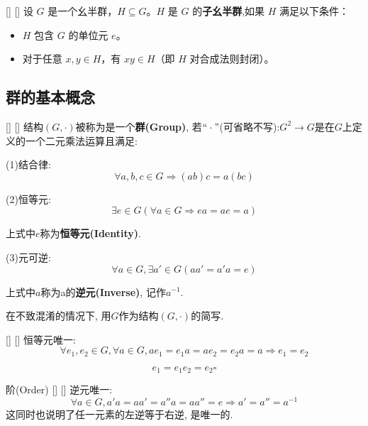 \documentclass[UTF8]{ctexart}
\begin{document}
		\begin{dfn}
            []
            {}
            []
            []
			设 \( G \) 是一个幺半群，\( H \subseteq G \)。\( H \) 是 \( G \) 的\textbf{子幺半群},如果 \( H \) 满足以下条件：
			\begin{itemize}
			\item \( H \) 包含 \( G \) 的单位元 \( e \)。
			\item 对于任意 \( x, y \in H \)，有 \( xy \in H \)（即 \( H \) 对合成法则封闭）。
			\end{itemize}
		\end{dfn}



		
	


	\subsection{群的基本概念}
	
		\begin{dfn}
            []
            {}
            []
            []
			结构$(G,\cdot)$被称为是一个\textbf{群(Group)}, 若$``\cdot"$(可省略不写):$G^2\to G$是在$G$上定义的一个二元乘法运算且满足: 
			
			(1)结合律: 
			\[\forall a,b,c\in G\Longrightarrow(ab)c = a(bc)\]
			
			(2)恒等元: 
			\[\exists e\in G(\forall a\in G\Longrightarrow ea=ae=a)\]
			
			上式中$e$称为\textbf{恒等元(Identity)}. 
			
			(3)元可逆: 
			\[\forall a\in G, \exists a'\in G(aa'=a'a=e)\]
			
			上式中$a$称为a的\textbf{逆元(Inverse)}, 记作$a^{-1}$. 

			在不致混淆的情况下, 用$G$作为结构$(G,\cdot)$的简写. 
		\end{dfn}
		
		\begin{ppt}
            []
            {}
            []
            []
			恒等元唯一: 
			\[\forall e_1,e_2\in G, \forall a\in G, ae_1=e_1 a=ae_2=e_2 a=a\Longrightarrow e_1=e_2\]
		\end{ppt}
        \begin{prf} 
			\[e_1=e_1 e_2=e_2\square\]
        \end{prf}
        
		\begin{ppt}
            []
            {阶(Order)}
            []
            []
			逆元唯一: 
			\[\forall a\in G, a'a=aa'=a''a=aa''=e\Longrightarrow a'=a''=a^{-1}\]
        这同时也说明了任一元素的左逆等于右逆, 是唯一的.
		\end{ppt}
  
\end{document}
